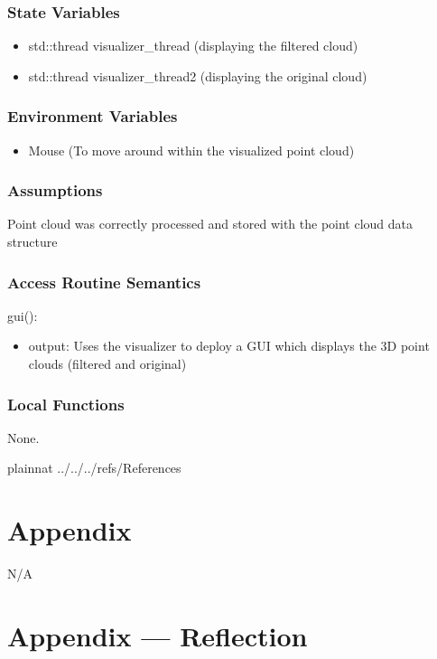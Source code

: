 \documentclass[12pt, titlepage]{article}
\begin{document}
\subsubsection{State Variables}

\begin{itemize}
  \item std::thread visualizer\_thread (displaying the filtered cloud)
  \item std::thread visualizer\_thread2 (displaying the original cloud)
\end{itemize}

\subsubsection{Environment Variables}

\begin{itemize}
  \item Mouse (To move around within the visualized point cloud)
\end{itemize}

\subsubsection{Assumptions}

Point cloud was correctly processed and stored with the point cloud data structure


\subsubsection{Access Routine Semantics}

\noindent gui():
\begin{itemize}
\item output: Uses the visualizer to deploy a GUI which displays the 3D point clouds (filtered and original)
\end{itemize}

\subsubsection{Local Functions}

None.

\newpage

 {plainnat}
 {../../../refs/References}

\newpage

\section{Appendix} \label{Appendix}

N/A

\newpage{}

\section*{Appendix --- Reflection}


\end{document}
